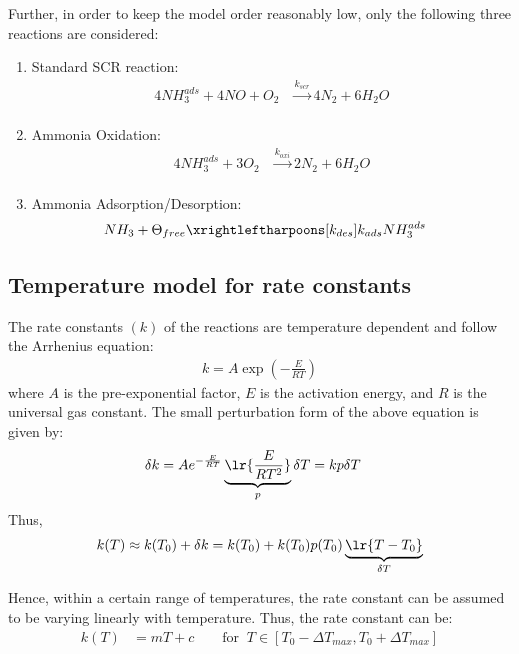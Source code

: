 Further, in order to keep the model order reasonably low, only the following three reactions are considered:
\begin{enumerate}
    \item Standard SCR reaction:
    \begin{align}
        4 NH_3 ^{ads} + 4 NO + O_2 &\xrightarrow[]{k_{scr}} 4 N_2 + 6 H_2O \label{eqn::std_scr}
    \end{align}
    \item Ammonia Oxidation:
    \begin{align}
        4 NH_3^{ads} + 3 O_2 &\xrightarrow[]{k_{oxi}} 2 N_2 + 6 H_2O \label{eqn::amox}
    \end{align}
    \item Ammonia Adsorption/Desorption:
        \begin{align}
            NH_3 + \Theta_{free} &\xrightleftharpoons[k_{des}]{k_{ads}} NH_3^{ads}
            \label{eqn::ads}
        \end{align}
\end{enumerate}


\subsection{Temperature model for rate constants}
The rate constants $(k)$ of the reactions are temperature dependent and follow the Arrhenius equation:
\begin{align*}
    k = A \exp\left(-\frac{E}{RT}\right)
\end{align*}
where $A$ is the pre-exponential factor, $E$ is the activation energy, and $R$ is the universal gas constant. The small
perturbation form of the above equation is given by:
\begin{align*}
    \delta k &= A e^{-\frac{E}{RT}} \underbrace{\lr{\frac{E}{RT^2}}}_p \delta T = k p \delta T
\end{align*}
Thus,
\begin{align*}
    k(T) \approx k(T_0) + \delta k = k(T_0) + k(T_0) p(T_0) \underbrace{\lr{T - T_0}}_{\delta T}
\end{align*}

Hence, within a certain range of temperatures, the rate constant can be assumed to be varying linearly with temperature.
Thus, the rate constant can be:
\begin{align*}
    k(T) &= mT + c \qquad  \text{for } \: T \in [T_0 - \Delta T_{max}, T_0 + \Delta T_{max}]
\end{align*}

